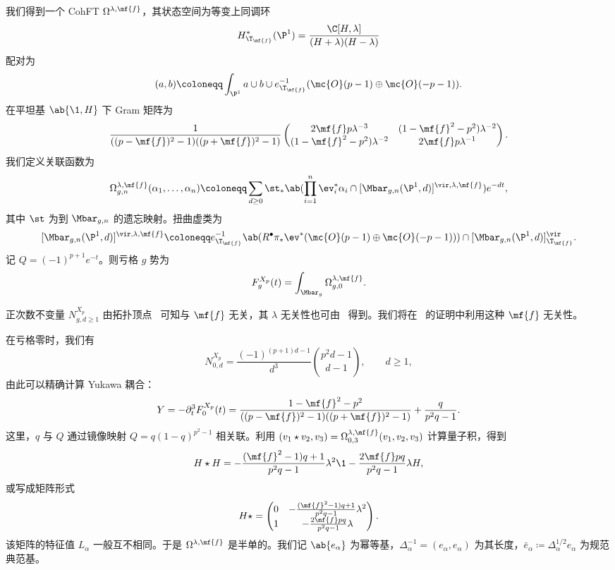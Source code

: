 我们得到一个 CohFT \(\Omega^{\lambda,\mf{f}}\)，其状态空间为等变上同调环
\[ H^*_{\T_{\mf{f}}}(\P^1) = \frac{\C[H,\lambda]}{(H+\lambda)(H-\lambda)} \]
配对为
\[ (a,b) \coloneqq \int_{\P^1} a \cup b \cup e^{-1}_{\T_{\mf{f}}}(\mc{O}(p-1)\oplus\mc{O}(-p-1)). \]
在平坦基 \(\ab\{\1,H\}\) 下 Gram 矩阵为
\[ \frac{1}{((p-\mf{f})^2-1)((p+\mf{f})^2-1)}\begin{pmatrix} 2\mf{f}p\lambda^{-3} & (1-\mf{f}^2-p^2)\lambda^{-2} \\ (1-\mf{f}^2-p^2)\lambda^{-2} & 2\mf{f}p\lambda^{-1} \end{pmatrix}. \]
我们定义关联函数为
\[ \Omega^{\lambda,\mf{f}}_{g,n}(\alpha_1,\ldots,\alpha_n) \coloneqq \sum_{d\geq0}\st_*\ab(\prod_{i=1}^n \ev_i^*\alpha_i \cap [\Mbar_{g,n}(\P^1,d)]^{\vir,\lambda,\mf{f}})e^{-dt}, \]
其中 \(\st\) 为到 \(\Mbar_{g,n}\) 的遗忘映射。扭曲虚类为
\[ [\Mbar_{g,n}(\P^1,d)]^{\vir,\lambda,\mf{f}} \coloneqq e^{-1}_{\T_{\mf{f}}}\ab(R^{\bullet}\pi_*\ev^*(\mc{O}(p-1)\oplus\mc{O}(-p-1))) \cap [\Mbar_{g,n}(\P^1,d)]^{\vir}_{\T_{\mf{f}}}. \]
记 \(Q = (-1)^{p+1}e^{-t}\)。则亏格 \(g\) 势为
\[ F^{X_p}_g(t) = \int_{\Mbar_g} \Omega^{\lambda,\mf{f}}_{g,0}. \]

\begin{rmk}
    正次数不变量 \(N^{X_p}_{g,d\geq1}\) 由拓扑顶点~\cite{LLLZ2009} 可知与 \(\mf{f}\) 无关，其 \(\lambda\) 无关性也可由~ 得到。我们将在~ 的证明中利用这种 \(\mf{f}\) 无关性。
\end{rmk}

在亏格零时，我们有
\[ N^{X_p}_{0,d} = \frac{(-1)^{(p+1)d-1}}{d^3}\binom{p^2d-1}{d-1}, \qquad d \geq 1, \]
由此可以精确计算 Yukawa 耦合：
\[ Y = -\partial_t^3 F_0^{X_p}(t) = \frac{1-\mf{f}^2-p^2}{((p-\mf{f})^2-1)((p+\mf{f})^2-1)} + \frac{q}{p^2q-1}. \]
这里，\(q\) 与 \(Q\) 通过镜像映射 \(Q = q(1-q)^{p^2-1}\) 相关联。利用 \((v_1 \star v_2, v_3) = \Omega^{\lambda,\mf{f}}_{0,3}(v_1,v_2,v_3)\) 计算量子积，得到
\[ H \star H = -\frac{(\mf{f}^2-1)q+1}{p^2q-1}\lambda^2 \1 - \frac{2\mf{f}pq}{p^2q-1}\lambda H, \]
或写成矩阵形式
\[ H \star = \begin{pmatrix} 0 & -\frac{(\mf{f}^2-1)q+1}{p^2q-1}\lambda^2 \\ 1 & -\frac{2\mf{f}pq}{p^2q-1}\lambda \end{pmatrix}. \]
该矩阵的特征值 \(L_{\alpha}\) 一般互不相同。于是 \(\Omega^{\lambda,\mf{f}}\) 是半单的。我们记 \(\ab\{e_{\alpha}\}\) 为幂等基，\(\Delta_{\alpha}^{-1} = (e_{\alpha},e_{\alpha})\) 为其长度，\(\bar{e}_{\alpha} \coloneqq \Delta_{\alpha}^{1/2}e_{\alpha}\) 为规范典范基。

